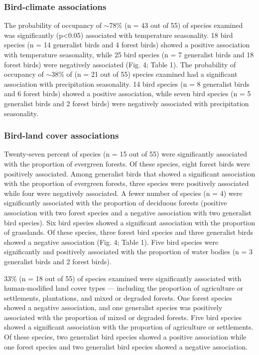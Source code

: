 \subsubsection*{Bird-climate associations}

The probability of occupancy of $\sim$78\% (n = 43 out of 55) of species examined was significantly (p<0.05) associated with temperature seasonality.
18 bird species (n = 14 generalist birds and 4 forest birds) showed a positive association with temperature seasonality, while 25 bird species (n = 7 generalist birds and 18 forest birds) were negatively associated (Fig.
4; Table 1).
The probability of occupancy of $\sim$38\% of (n = 21 out of 55) species examined had a significant association with precipitation seasonality.
14 bird species (n = 8 generalist birds and 6 forest birds) showed a positive association, while seven bird species (n = 5 generalist birds and 2 forest birds) were negatively associated with precipitation seasonality.

\subsubsection*{Bird-land cover associations}

Twenty-seven percent of species (n = 15 out of 55) were significantly associated with the proportion of evergreen forests.
Of these species, eight forest birds were positively associated.
Among generalist birds that showed a significant association with the proportion of evergreen forests, three species were positively associated while four were negatively associated.
A fewer number of species (n = 4) were significantly associated with the proportion of deciduous forests (positive association with two forest species and a negative association with two generalist bird species).
Six bird species showed a significant association with the proportion of grasslands.
Of these species, three forest bird species and three generalist birds showed a negative association (Fig.
4; Table 1).
Five bird species were significantly and positively associated with the proportion of water bodies (n = 3 generalist birds and 2 forest birds).

33\% (n = 18 out of 55) of species examined were significantly associated with human-modified land cover types --- including the proportion of agriculture or settlements, plantations, and mixed or degraded forests.
One forest species showed a negative association, and one generalist species was positively associated with the proportion of mixed or degraded forests.
Five bird species showed a significant association with the proportion of agriculture or settlements.
Of these species, two generalist bird species showed a positive association while one forest species and two generalist bird species showed a negative association.

